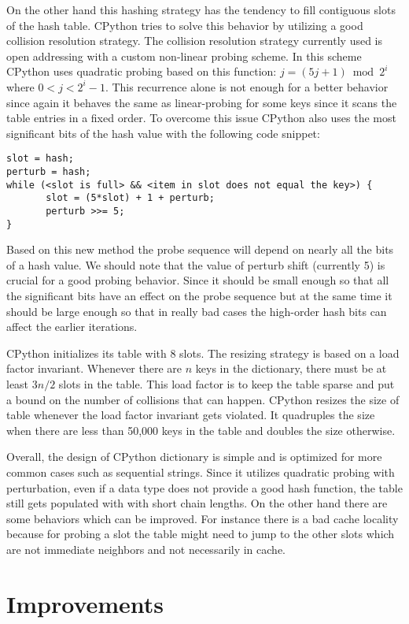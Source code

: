 \documentclass[11pt]{article}
\begin{document}
On the other hand this hashing strategy has the tendency to fill contiguous slots of the
hash table. CPython tries to solve this behavior by utilizing a good collision resolution strategy. The collision resolution strategy currently used is open addressing with a custom non-linear probing scheme. In this scheme CPython uses quadratic probing based on this function: $j = (5j + 1) \bmod 2^i$ where $0<j<2^i-1$. This recurrence alone is not enough for a better behavior since again it behaves the same as linear-probing for some keys since it scans the table entries in a fixed order. To overcome this issue CPython also uses the most significant bits of the hash value with the following code snippet:
\begin{verbatim}
slot = hash;
perturb = hash;
while (<slot is full> && <item in slot does not equal the key>) {
       slot = (5*slot) + 1 + perturb;
       perturb >>= 5;
}
\end{verbatim}
Based on this new method the probe sequence will depend on nearly all the bits of a hash value. We should note that the value of  perturb shift (currently 5) is crucial for a good probing behavior. Since it should be small enough so that  all the significant bits have an  effect on the probe sequence but at the same time it should be large enough so that in really bad cases the high-order hash bits can affect the earlier iterations.

CPython initializes its table with 8 slots. The resizing strategy is based on a load factor invariant. Whenever there are $n$ keys in the dictionary, there must be at least $3n/2$ slots in the table. This load factor is to keep the table sparse and put a bound on the number of collisions that can happen. CPython resizes the size of table whenever the load factor invariant gets violated. It quadruples the size when there are less than 50,000 keys in the table and doubles the size otherwise. 

Overall, the design of CPython dictionary is simple and is optimized for more common cases such as sequential strings. Since it utilizes quadratic probing with perturbation, even if a data type does not provide a good hash function, the table still gets populated with with short chain lengths.  On the other hand there are some behaviors which can be improved. For instance there is a bad cache locality because for probing a slot the table might need to jump to the other slots which are not immediate neighbors and not necessarily in cache. 

\section{Improvements}
\end{document}
